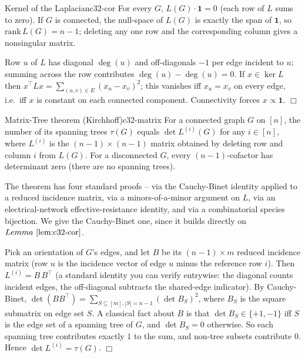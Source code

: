 \begin{lemma}{Kernel of the Laplacian}{c32-cor}
For every \(G\), \(L(G)\cdot \mathbf{1} = 0\) (each row of \(L\) sums to
zero).  If \(G\) is connected, the null-space of \(L(G)\) is exactly the
span of \(\mathbf{1}\), so \(\mathrm{rank}\,L(G) = n-1\); deleting any one
row and the corresponding column gives a nonsingular matrix.
\end{lemma}

\begin{proofbox}
Row \(u\) of \(L\) has diagonal \(\deg(u)\) and off-diagonals \(-1\) per edge
incident to \(u\); summing across the row contributes \(\deg(u) - \deg(u) =
0\).  If \(x\in\ker L\) then \(x^\top L x = \sum_{(u,v)\in E}(x_u-x_v)^2\);
this vanishes iff \(x_u=x_v\) on every edge, i.e.\ iff \(x\) is constant on
each connected component.  Connectivity forces \(x\propto\mathbf{1}\).
\(\Box\)
\end{proofbox}

\begin{theorem}{Matrix-Tree theorem (Kirchhoff)}{c32-matrix}
For a connected graph \(G\) on \([n]\), the number of its spanning trees
\(\tau(G)\) equals \(\det L^{(i)}(G)\) for any \(i\in[n]\), where \(L^{(i)}\)
is the \((n-1)\times(n-1)\) matrix obtained by deleting row and column \(i\)
from \(L(G)\).  For a disconnected \(G\), every \((n-1)\)-cofactor has
determinant zero (there are no spanning trees).
\end{theorem}

The theorem has four standard proofs -- via the Cauchy-Binet identity
applied to a reduced incidence matrix, via a minors-of-a-minor argument on
\(L\), via an electrical-network effective-resistance identity, and via a
combinatorial species bijection.  We give the Cauchy-Binet one, since it
builds directly on \(\lemref{c32-cor}\).

\begin{proofbox}
Pick an orientation of \(G\)'s edges, and let \(B\) be its \((n-1)\times m\)
reduced incidence matrix (row \(u\) is the incidence vector of edge \(u\)
minus the reference row \(i\)).  Then \(L^{(i)} = B\,B^\top\) (a standard
identity you can verify entrywise: the diagonal counts incident edges, the
off-diagonal subtracts the shared-edge indicator).  By Cauchy-Binet, \(\det
(BB^\top) = \sum_{S\subseteq[m], |S|=n-1} (\det B_S)^2\), where \(B_S\) is the
square submatrix on edge set \(S\).  A classical fact about \(B\) is that
\(\det B_S\in\{+1,-1\}\) iff \(S\) is the edge set of a spanning tree of
\(G\), and \(\det B_S = 0\) otherwise.  So each spanning tree contributes
exactly \(1\) to the sum, and non-tree subsets contribute \(0\).  Hence
\(\det L^{(i)} = \tau(G)\). \(\Box\)
\end{proofbox}

